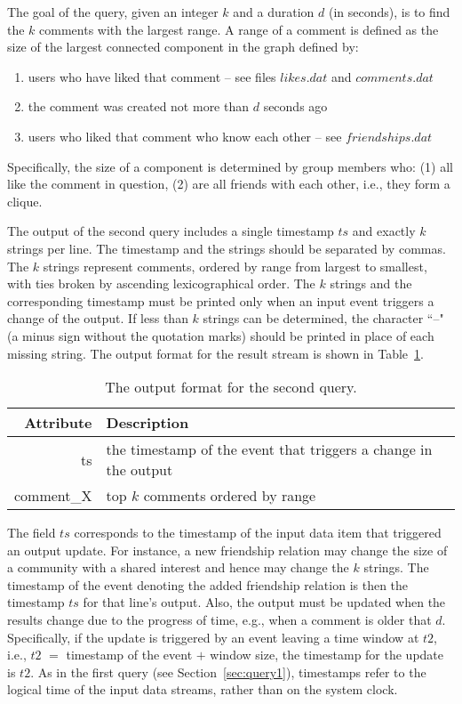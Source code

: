 \documentclass{sig-alternate}
\begin{document}
The goal of the query, given an integer $k$ and a duration $d$ (in seconds), is to find the $k$ comments with the largest range. A range of a comment is defined as the size of the largest connected component in the graph defined by:  
\begin{enumerate}
		\item users who have liked that comment -- see files $likes.dat$ and $comments.dat$
		\item the comment was created not more than $d$ seconds ago
		\item users who liked that comment who know each other -- see $friendships.dat$
\end{enumerate}	
Specifically, the size of a component is determined by group members who: (1) all like the comment in question, (2) are all friends with each other, i.e., they form a clique.

The output of the second query includes a single timestamp $ts$ and exactly $k$ strings per line. The timestamp and the strings should be separated by commas. The $k$ strings represent comments, ordered by range from largest to smallest, with ties broken by ascending lexicographical order. The $k$ strings and the corresponding timestamp must be printed only when an input event triggers a change of the output. If less than $k$ strings can be determined, the character ``--" (a minus sign without the quotation marks) should be printed in place of each missing string. The output format for the result stream is shown in Table~\ref{table:query2}. 

\begin{table}[ht]
	\caption{The output format for the second query.}
	\centering 
	\begin{tabular}{r p{5.2cm}}
		\toprule
		Attribute		&	 Description\\
		\midrule
		ts			&	the timestamp of the event that triggers a change in the output\\[2ex]
		comment\_X	&	top $k$ comments ordered by range\\[2ex]		
		\bottomrule 
	\end{tabular}
	\label{table:query2}
\end{table}

The field $ts$ corresponds to the timestamp of the input data item that triggered an output update. For instance, a new friendship relation may change the size of a community with a shared interest and hence may change the $k$ strings. The timestamp of the event denoting the added friendship relation is then the timestamp $ts$ for that line's output. Also, the output must be updated when the results change due to the progress of time, e.g., when a comment is older that $d$. Specifically, if the update is triggered by an event leaving a time window at $t2$, i.e., $t2$ $=$ timestamp of the event $+$ window size, the timestamp for the update is $t2$. As in the first query (see Section~\ref{sec:query1}), timestamps refer to the logical time of the input data streams, rather than on the system clock.
\end{document}
